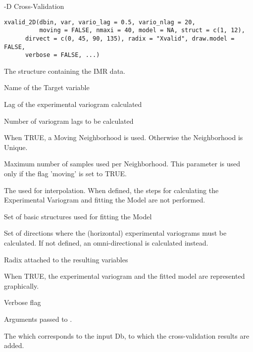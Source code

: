 %
\begin{Description}-D Cross-Validation
\end{Description}
%
\begin{Usage}
\begin{verbatim}
xvalid_2D(dbin, var, vario_lag = 0.5, vario_nlag = 20,
          moving = FALSE, nmaxi = 40, model = NA, struct = c(1, 12),
	  dirvect = c(0, 45, 90, 135), radix = "Xvalid", draw.model = FALSE,
	  verbose = FALSE, ...)
\end{verbatim}
\end{Usage}
%
\begin{Arguments}
\begin{ldescription}
\item[\code{dbin}] 
The  structure containing the IMR data.

\item[\code{var}] 
Name of the Target variable

\item[\code{vario\_lag}] 
Lag of the experimental variogram calculated

\item[\code{vario\_nlag}] 
Number of variogram lags to be calculated

\item[\code{moving}] 
When TRUE, a Moving Neighborhood is used. Otherwise the Neighborhood is
Unique.

\item[\code{nmaxi}] 
Maximum number of samples used per Neighborhood. This parameter is
used only if the flag 'moving' is set to TRUE.

\item[\code{model}] 
The  used for interpolation. When defined,
the steps for calculating the Experimental Variogram and fitting the Model
are not performed.

\item[\code{struct}] 
Set of basic structures used for fitting the Model

\item[\code{dirvect}] 
Set of directions where the (horizontal) experimental variograms must be
calculated. If not defined, an omni-directional is calculated instead.

\item[\code{radix}] 
Radix attached to the resulting variables

\item[\code{draw.model}] 
When TRUE, the experimental variogram and the fitted model are represented
graphically.

\item[\code{verbose}] 
Verbose flag

\item[\code{...}] 
Arguments passed to .

\end{ldescription}
\end{Arguments}
%
\begin{Value}
The  which corresponds to the input Db, to which the
cross-validation results are added.
\end{Value}
